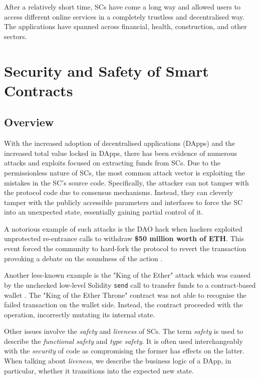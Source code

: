 \documentclass[oneside]{ecsproject}     %
\begin{document}
After a relatively short time, SCs have come a long way and allowed users to access different online services in a completely trustless and decentralised way.
The applications have spanned across financial, health, construction\cite{cad_blockchain}, and other sectors. 

\chapter{Security and Safety of Smart Contracts}

\section{Overview}

With the increased adoption of decentralised applications (DApps) and the increased total value locked in DApps, 
there has been evidence of numerous attacks and exploits focused on extracting funds from SCs. 
Due to the permissionless nature of SCs, the most common attack vector is exploiting the mistakes in the SC's source code.
Specifically, the attacker can not tamper with the protocol code due to consensus mechanisms.
Instead, they can cleverly tamper with the publicly accessible parameters and interfaces to force the SC into an unexpected state, essentially gaining partial control of it.

A notorious example of such attacks is the DAO hack when hackers exploited unprotected re-entrance calls to withdraw \textbf{\$50 million worth of ETH}. 
This event forced the community to hard-fork the protocol to revert the transaction provoking a debate on the soundness of the action \cite{the_dao}.

Another less-known example is the "King of the Ether" attack which was caused by the unchecked low-level Solidity \texttt{send} call to transfer funds to a contract-based wallet \cite{king_of_the_ether}.
The "King of the Ether Throne" contract was not able to recognise the failed transaction on the wallet side. Instead, the contract proceeded with the operation, incorrectly mutating its internal state.

Other issues involve the \textit{safety} and \textit{liveness} of SCs. 
The term \textit{safety} is used to describe the \textit{functional safety} and \textit{type safety}. It is often used interchangeably with the \textit{security} of code
as compromising the former has effects on the latter. When talking about \textit{liveness}, we describe the business logic of a DApp, in particular, whether it transitions into the expected new state.
\end{document}
